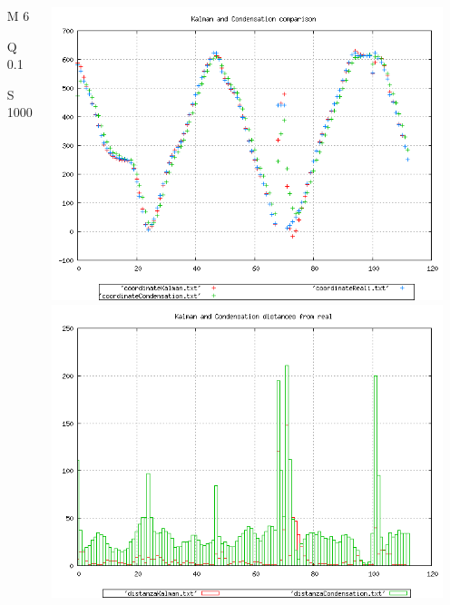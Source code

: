 \documentclass{beamer}
\begin{document}
{\begin{columns}
\begin{scriptsize}
\begin{itemize}
\item [M]6
\item [Q]0.1
\item [S]1000
\end{itemize}
\end{scriptsize}
\includegraphics[scale=0.1]{../esperimenti/single_car/mod_6-Q_0.1-S_1000/plot.png}\\
\includegraphics[scale=0.1]{../esperimenti/single_car/mod_6-Q_0.1-S_1000/plot-distances.png}


\end{columns}}
\end{document}
